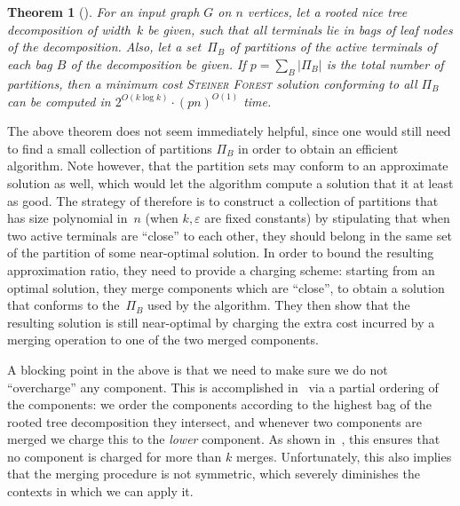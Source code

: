\documentclass[a4paper]{article}
\let\oldcitet\citet
\renewcommand{\citet}[1]{\mbox{\oldcitet{#1}}}
\theoremstyle{plain}
\newtheorem{theorem}{Theorem}%
\newcommand{\eps}{{\varepsilon}}
\newcommand{\pname}[1]{\textsc{#1}}
\newcommand{\SF}{\pname{Steiner Forest}\xspace}
\begin{document}
\begin{theorem}[\citet{bateni2011approximation}]\label{thm:tw-dp} For an input
graph $G$ on $n$ vertices, let a rooted nice tree decomposition of width~$k$ be
given, such that all terminals lie in bags of leaf nodes of the decomposition.
Also, let a set~$\Pi_B$ of partitions of the active terminals of each bag $B$ of
the decomposition be given. If $p=\sum_B |\Pi_B|$ is the total number of
partitions, then a minimum cost \SF solution conforming to all $\Pi_B$ can be
computed in $2^{O(k\log k)}\cdot(pn)^{O(1)}$ time.  
\end{theorem}

The above theorem does not seem immediately helpful, since one would still need to
find a small collection of partitions $\Pi_B$ in order to obtain an efficient algorithm. 
Note however, that the partition sets may conform to an approximate solution as well, which
would let the algorithm compute a solution that it at least as good.
The strategy of \cite{bateni2011approximation} therefore is to
construct a collection of partitions that has size polynomial in~$n$ (when $k,\eps$ are
fixed constants) by stipulating that when two active terminals are ``close'' to
each other, they should belong in the same set of the partition of some near-optimal solution. In order to
bound the resulting approximation ratio, they need to provide a
charging scheme: starting from an optimal solution, they merge components which are
``close'', to obtain a solution that conforms to the~$\Pi_B$ used by the algorithm. 
They then show that the resulting solution is still near-optimal by charging the extra
cost incurred by a merging operation to one of the two merged components.

A blocking point in the above is that we need to make sure we do not
``overcharge'' any component. This is accomplished in~\cite{bateni2011approximation}
via a partial ordering of the components: we
order the components according to the highest bag of the rooted tree decomposition they
intersect, and whenever two components are merged we charge this to the
\emph{lower} component. As shown in~\cite{bateni2011approximation},
this ensures that no component is charged for more than
$k$ merges. Unfortunately, this also implies that the merging procedure is not
symmetric, which severely diminishes the contexts in which we can apply it.
\end{document}

